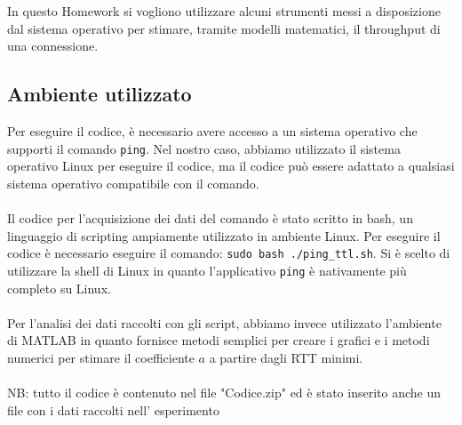In questo Homework si vogliono utilizzare alcuni strumenti messi a disposizione dal sistema operativo per stimare, tramite modelli matematici, il throughput di una connessione.
\subsection{Ambiente utilizzato}
Per eseguire il codice, è necessario avere accesso a un sistema operativo che supporti il comando \texttt{ping}. Nel nostro caso, abbiamo utilizzato il sistema operativo Linux per eseguire il codice, ma il codice può essere adattato a qualsiasi sistema operativo compatibile con il comando.\\\\
Il codice per l'acquisizione dei dati del comando è stato scritto in bash, un linguaggio di scripting ampiamente utilizzato in ambiente Linux. Per eseguire il codice è necessario eseguire il comando: \texttt{sudo bash ./ping\_ttl.sh}. Si è scelto di utilizzare la shell di Linux in quanto l'applicativo \texttt{ping} è nativamente più completo su Linux.\\\\
Per l'analisi dei dati raccolti con gli script, abbiamo invece utilizzato l'ambiente di MATLAB \Rcerchio in quanto fornisce metodi semplici per creare i grafici e i metodi numerici per stimare il coefficiente $a$ a partire dagli RTT minimi.\\\\
NB: tutto il codice è contenuto nel file "Codice.zip" ed è stato inserito anche un file con i dati raccolti nell' esperimento
